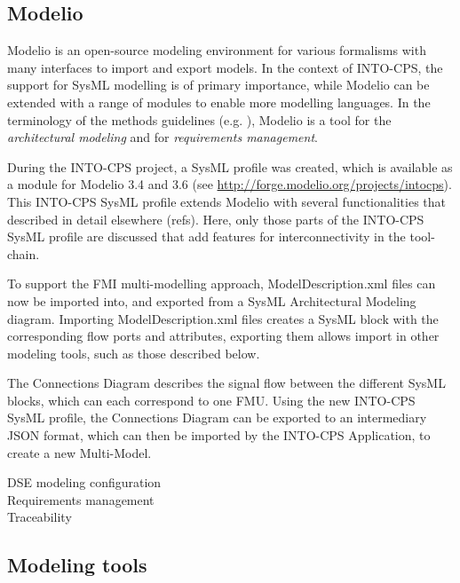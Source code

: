 \subsection{Modelio}

Modelio is an open-source modeling environment for various formalisms with many interfaces to import and export models. In the context of INTO-CPS, the support for SysML modelling is of primary importance, while Modelio can be extended with a range of modules to enable more modelling languages. In the terminology of the methods guidelines (e.g. \cite{INTOCPSD3.3a}), Modelio is a tool for the \textit{architectural modeling} and for \textit{requirements management}.

During the INTO-CPS project, a SysML profile was created, which is available as a module for Modelio 3.4 and 3.6 (see \url{http://forge.modelio.org/projects/intocps}). This INTO-CPS SysML profile extends Modelio with several functionalities that described in detail elsewhere (refs). Here, only those parts of the INTO-CPS SysML profile are discussed that add features for interconnectivity in the tool-chain.

To support the FMI multi-modelling approach, ModelDescription.xml files can now be imported into, and exported from a SysML Architectural Modeling diagram. Importing ModelDescription.xml files creates a SysML block with the corresponding flow ports and attributes, exporting them allows import in other modeling tools, such as those described below.

The Connections Diagram describes the signal flow between the different SysML blocks, which can each correspond to one FMU. Using the new INTO-CPS SysML profile, the Connections Diagram can be exported to an intermediary JSON format, which can then be imported by the INTO-CPS Application, to create a new Multi-Model.

DSE modeling configuration\\
Requirements management\\
Traceability\\

\subsection{Modeling tools}

